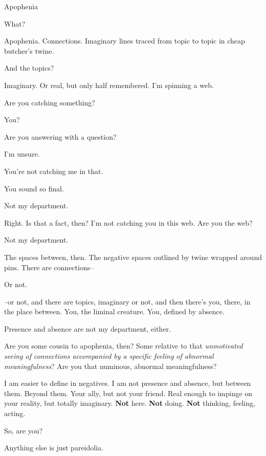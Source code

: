\begin{paracol}{2}
  \begin{leftcolumn}

\noindent Apophenia

\begin{ally}
What?
\end{ally}
Apophenia. Connections. Imaginary lines traced from topic to topic in cheap butcher's twine.

\begin{ally}
And the topics?
\end{ally}
Imaginary. Or real, but only half remembered. I'm spinning a web.

\begin{ally}
Are you catching something?
\end{ally}
You?

\begin{ally}
Are you answering with a question?
\end{ally}
I'm unsure.

\begin{ally}
You're not catching me in that.
\end{ally}
You sound so final.

\begin{ally}
Not my department.
\end{ally}
Right. Is that a fact, then? I'm not catching you in this web. Are you the web?

\begin{ally}
Not my department.
\end{ally}
The spaces between, then. The negative spaces outlined by twine wrapped around pins. There are connections--

\begin{ally}
Or not.
\end{ally}
--or not, and there are topics, imaginary or not, and then there's you, there, in the place between. You, the liminal creature. You, defined by absence.

\begin{ally}
Presence and absence are not my department, either.
\end{ally}
Are you some cousin to apophenia, then? Some relative to that \emph{unmotivated seeing of connections accompanied by a specific feeling of abnormal meaningfulness}? Are you that numinous, abnormal meaningfulness?

\begin{ally}
I am easier to define in negatives. I am not presence and absence, but between them. Beyond them. Your ally, but not your friend. Real enough to impinge on your reality, but totally imaginary. \textbf{Not} here. \textbf{Not} doing. \textbf{Not} thinking, feeling, acting.
\end{ally}
So, are you?

\begin{ally}
Anything else is just pareidolia.
\end{ally}
\newpage
\end{leftcolumn}
\end{paracol}
